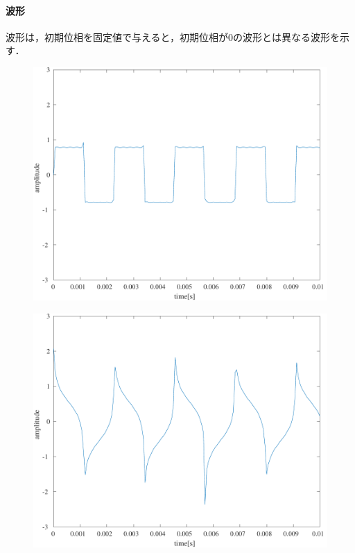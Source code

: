 \paragraph{波形}波形は，初期位相を固定値で与えると，初期位相が\(0\)の波形とは異なる波形を示す．
\begin{figure}[H]
    \centering
    \begin{minipage}[b]{.24\textwidth}
        \centering
        \label{fig:実験結果矩形波_pure}
        \includegraphics[keepaspectratio,width=\textwidth]{../../Figures/03_11_kukei.pdf}
    \end{minipage}
    \begin{minipage}[b]{.24\textwidth}
        \centering
        \label{fig:実験結果矩形波_p4PI}
        \includegraphics[keepaspectratio,width=\textwidth]{../../Figures/03_12.pdf}

\end{minipage}
\end{figure}
